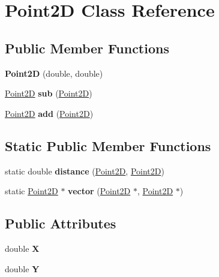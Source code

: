 \hypertarget{classPoint2D}{}\section{Point2D Class Reference}
\label{classPoint2D}
\subsection*{Public Member Functions}
\begin{DoxyCompactItemize}
\item 
\mbox{\label{classPoint2D_a0e3ee506aac9ae6461bdf6083c7596b0}} 
{\bfseries Point2D} (double, double)
\item 
\mbox{\label{classPoint2D_a6853dff081e82d0349b349cc2362b360}} 
\hyperlink{classPoint2D}{Point2D} {\bfseries sub} (\hyperlink{classPoint2D}{Point2D})
\item 
\mbox{\label{classPoint2D_a26f33af7a25257f0e87ddbeeb65e9fb9}} 
\hyperlink{classPoint2D}{Point2D} {\bfseries add} (\hyperlink{classPoint2D}{Point2D})
\end{DoxyCompactItemize}
\subsection*{Static Public Member Functions}
\begin{DoxyCompactItemize}
\item 
\mbox{\label{classPoint2D_ad5491be33bca3403d4e1d20e42b30750}} 
static double {\bfseries distance} (\hyperlink{classPoint2D}{Point2D}, \hyperlink{classPoint2D}{Point2D})
\item 
\mbox{\label{classPoint2D_ad823958e5f2041fa3b4e433b3ce17b2f}} 
static \hyperlink{classPoint2D}{Point2D} $\ast$ {\bfseries vector} (\hyperlink{classPoint2D}{Point2D} $\ast$, \hyperlink{classPoint2D}{Point2D} $\ast$)
\end{DoxyCompactItemize}
\subsection*{Public Attributes}
\begin{DoxyCompactItemize}
\item 
\mbox{\label{classPoint2D_a18681fb0a8389c0c501d6e38f90cc1b5}} 
double {\bfseries X}
\item 
\mbox{\label{classPoint2D_ab2b22ea52c6db3697fd8ce4827103654}} 
double {\bfseries Y}
\end{DoxyCompactItemize}
